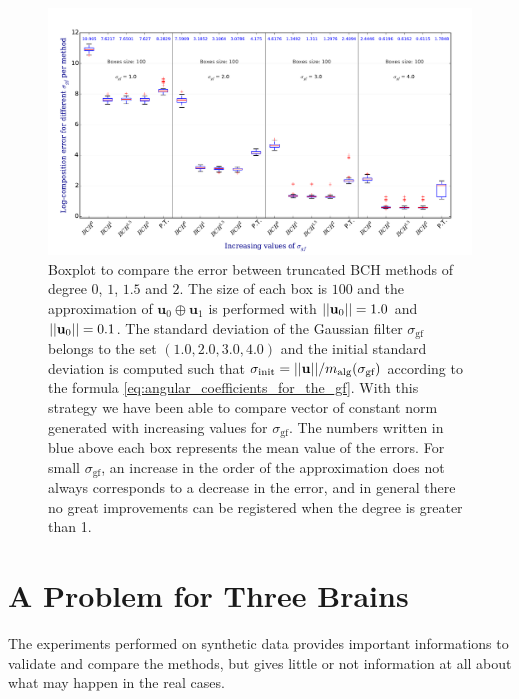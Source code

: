 \begin{figure}[!ht]
	\hspace{-0.5cm}
	\includegraphics[scale=0.5]{figures/SVF_boxplot_comparisons_BCH.pdf}
	\caption{Boxplot to compare the error between truncated BCH methods of degree $0$, $1$, $1.5$ and $2$. The size of each box is $100$ and the approximation of $\mathbf{u}_{0}\oplus \mathbf{u}_1$ is performed with $\vert\lvert \mathbf{u}_{0} \rvert\vert = 1.0$ and $\vert\lvert \mathbf{u}_{0} \rvert\vert = 0.1$. The standard deviation of the Gaussian filter $\sigma_{\text{gf}}$ belongs to the set $(1.0, 2.0, 3.0, 4.0)$ and the initial standard deviation is computed such that $\sigma_{\text{init}} = \vert\lvert \mathbf{u} \rvert\vert/m_{\text{alg}}(\sigma_{\text{gf}})$ according to the formula \ref{eq:angular_coefficients_for_the_gf}. With this strategy we have been able to compare vector of constant norm generated with increasing values for $\sigma_{\text{gf}}$. The numbers written in blue above each box represents the mean value of the errors. For small $\sigma_{\text{gf}}$, an increase in the order of the approximation does not always corresponds to a decrease in the error, and in general there no great improvements can be registered when the degree is greater than 1. }
	\label{fig:SVF_boxplot_comparisons_BCH}
\end{figure}


\newpage

\section{A Problem for Three Brains}\label{se:three_brains} %
The experiments performed on synthetic data provides important informations to validate and compare the methods, but gives little or not information at all about what may happen in the real cases. 

